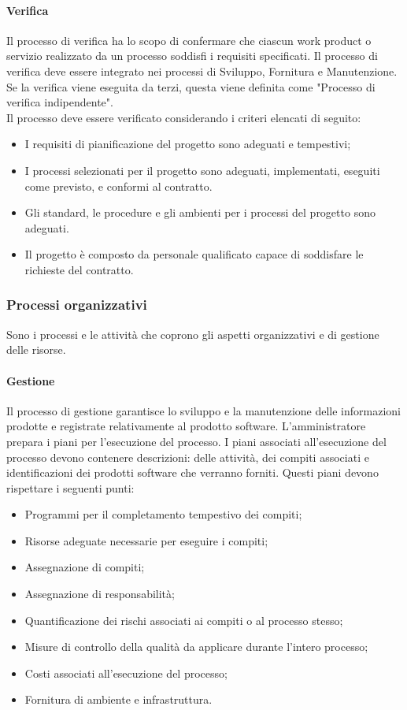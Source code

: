 \paragraph{Verifica}
Il processo di verifica ha lo scopo di confermare che ciascun work product o servizio realizzato da un processo soddisfi i requisiti specificati. 
Il processo di verifica deve essere integrato nei processi di Sviluppo, Fornitura e Manutenzione. Se la verifica viene eseguita da terzi, questa viene definita come "Processo di verifica indipendente".
\\
Il processo deve essere verificato considerando i criteri elencati di seguito:
\begin{itemize}
    \item I requisiti di pianificazione del progetto sono adeguati e tempestivi;
    \item I processi selezionati per il progetto sono adeguati, implementati, eseguiti come previsto, e conformi al contratto.
    \item Gli standard, le procedure e gli ambienti per i processi del progetto sono adeguati.
    \item Il progetto è composto da personale qualificato capace di soddisfare le richieste del contratto.
\end{itemize}

\subsubsection{Processi organizzativi}
Sono i processi e le attività che coprono gli aspetti organizzativi e di gestione delle risorse.

\paragraph{Gestione}
Il processo di gestione garantisce lo sviluppo e la manutenzione delle informazioni prodotte e registrate relativamente 
al prodotto software. L'amministratore prepara i piani per l'esecuzione del processo.
I piani associati all'esecuzione del processo devono contenere descrizioni: delle attività, dei compiti associati e
identificazioni dei prodotti software che verranno forniti. Questi piani devono rispettare i seguenti punti:
\begin{itemize}
    \item Programmi per il completamento tempestivo dei compiti;
    \item Risorse adeguate necessarie per eseguire i compiti;
    \item Assegnazione di compiti;
    \item Assegnazione di responsabilità;
    \item Quantificazione dei rischi associati ai compiti o al processo stesso;
    \item Misure di controllo della qualità da applicare durante l'intero processo;
    \item Costi associati all'esecuzione del processo;
    \item Fornitura di ambiente e infrastruttura.
\end{itemize}
